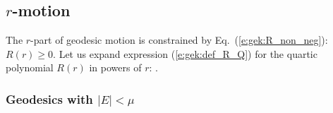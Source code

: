 \subsection{$r$-motion} \label{s:gek:r-motion}

The $r$-part of geodesic motion is constrained by Eq.~(\ref{e:gek:R_non_neg}):
$R(r) \geq 0$. Let us expand expression (\ref{e:gek:def_R_Q})
for the quartic polynomial $R(r)$ in powers of $r$:
\be \label{e:gek:R_r_powers}
     .
\ee

\subsubsection{Geodesics with $|E|<\mu$} \label{s:gek:bound_geod}

